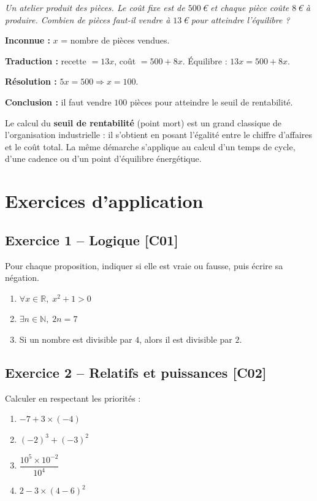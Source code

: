 \documentclass[a4paper,11pt]{article}
\begin{document}
\begin{exemple}
\emph{Un atelier produit des pièces. Le coût fixe est de $500\,$€ et chaque pièce coûte $8\,$€ à produire. Combien de pièces faut-il vendre à $13\,$€ pour atteindre l'équilibre ?}

\textbf{Inconnue :} $x$ = nombre de pièces vendues.

\textbf{Traduction :} recette $= 13x$, coût $= 500 + 8x$. Équilibre : $13x = 500 + 8x$.

\textbf{Résolution :} $5x = 500 \Rightarrow x = 100$.

\textbf{Conclusion :} il faut vendre $100$ pièces pour atteindre le seuil de rentabilité.
\end{exemple}

\begin{appliindus}
Le calcul du \textbf{seuil de rentabilité} (point mort) est un grand classique de l'organisation industrielle : il s'obtient en posant l'égalité entre le chiffre d'affaires et le coût total. La même démarche s'applique au calcul d'un temps de cycle, d'une cadence ou d'un point d'équilibre énergétique.
\end{appliindus}

\newpage
\section{Exercices d'application}

\subsection*{Exercice 1 -- Logique \hfill {\normalsize\color{uimmred}[C01]}}
Pour chaque proposition, indiquer si elle est vraie ou fausse, puis écrire sa négation.
\begin{enumerate}[label=\alph*)]
  \item $\forall x \in \mathbb{R},\; x^2 + 1 > 0$
  \item $\exists n \in \mathbb{N},\; 2n = 7$
  \item Si un nombre est divisible par $4$, alors il est divisible par $2$.
\end{enumerate}

\subsection*{Exercice 2 -- Relatifs et puissances \hfill {\normalsize\color{uimmred}[C02]}}
Calculer en respectant les priorités :
\begin{enumerate}[label=\alph*)]
  \item $-7 + 3 \times (-4)$
  \item $(-2)^3 + (-3)^2$
  \item $\dfrac{10^5 \times 10^{-2}}{10^{4}}$
  \item $2 - 3 \times (4 - 6)^2$
\end{enumerate}
\end{document}
